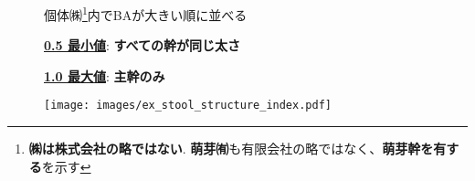 \documentclass[a0, 36pt, plainboxedsections]{sciposter} %
\begin{document}
\begin{multicols}{2}
\vspace{-1.0em}
\begin{figure}
 \begin{minipage}{0.55\hsize}

個体㈱\footnote{\textbf{㈱は株式会社の略ではない}. \textbf{萌芽㈲}も有限会社の略ではなく、\textbf{萌芽幹を有する}を示す}内でBAが大きい順に並べる

\textbf{\underline{0.5 最小値}}: \textbf{すべての幹が同じ太さ}

\textbf{\underline{1.0 最大値}}: \textbf{主幹のみ}
 \end{minipage}
 \begin{minipage}{0.45\hsize}
  \vspace{-0.8em}\flushright
   \texttt{[image: images/ex\_stool\_structure\_index.pdf]}  
 \end{minipage}
\end{figure}

\end{multicols}
\begin{mdframed}[style=section.frame]
  \flushleft\LARGE\textbf{\color{white}{結果}}
\end{mdframed}\vspace{-1.2em}
\end{document}
